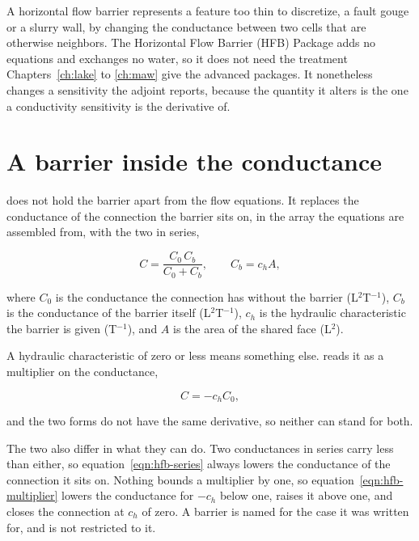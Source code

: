A horizontal flow barrier represents a feature too thin to discretize, a fault gouge or a slurry wall, by changing the conductance between two cells that are otherwise neighbors. The Horizontal Flow Barrier (HFB) Package adds no equations and exchanges no water, so it does not need the treatment Chapters~\ref{ch:lake} to \ref{ch:maw} give the advanced packages. It nonetheless changes a sensitivity the adjoint reports, because the quantity it alters is the one a conductivity sensitivity is the derivative of.

\section*{A barrier inside the conductance}

\mf{} does not hold the barrier apart from the flow equations. It replaces the conductance of the connection the barrier sits on, in the array the equations are assembled from, with the two in series,

\begin{equation}
	\label{eqn:hfb-series}
	C = \frac{C_{0} \, C_{b}}{C_{0} + C_{b}}, \qquad C_{b} = c_{h} A,
\end{equation}

\noindent where $C_{0}$ is the conductance the connection has without the barrier (L$^{2}$T$^{-1}$), $C_{b}$ is the conductance of the barrier itself (L$^{2}$T$^{-1}$), $c_{h}$ is the hydraulic characteristic the barrier is given (T$^{-1}$), and $A$ is the area of the shared face (L$^{2}$).

A hydraulic characteristic of zero or less means something else. \mf{} reads it as a multiplier on the conductance,

\begin{equation}
	\label{eqn:hfb-multiplier}
	C = -c_{h} C_{0},
\end{equation}

\noindent and the two forms do not have the same derivative, so neither can stand for both.

The two also differ in what they can do. Two conductances in series carry less than either, so equation~\ref{eqn:hfb-series} always lowers the conductance of the connection it sits on. Nothing bounds a multiplier by one, so equation~\ref{eqn:hfb-multiplier} lowers the conductance for $-c_{h}$ below one, raises it above one, and closes the connection at $c_{h}$ of zero. A barrier is named for the case it was written for, and is not restricted to it.

